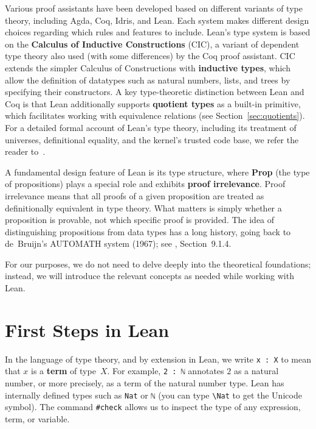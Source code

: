 Various proof assistants have been developed based on different
variants of type theory, including Agda, Coq, Idris, and Lean.
Each system makes different design choices regarding which rules and
features to include.
Lean's type system is based on the \textbf{Calculus of Inductive
  Constructions} (CIC), a variant of dependent type theory also used
(with some differences) by the Coq proof assistant.
CIC extends the simpler Calculus of Constructions with
\textbf{inductive types}, which allow the definition of datatypes
such as natural numbers, lists, and trees by specifying their
constructors.
A key type-theoretic distinction between Lean and Coq is that Lean
additionally supports \textbf{quotient types} as a built-in
primitive, which facilitates working with equivalence relations
(see Section~\ref{sec:quotients}).
For a detailed formal account of Lean's type theory, including its
treatment of universes, definitional equality, and the kernel's
trusted code base, we refer the reader
to~\cite{carneiro2019type}.

A fundamental design feature of Lean is its type structure, where
\textbf{Prop} (the type of propositions) plays a special role and
exhibits \textbf{proof irrelevance}.
Proof irrelevance means that all proofs of a given proposition are
treated as definitionally equivalent in type theory.
What matters is simply whether a proposition is provable, not which
specific proof is provided.
The idea of distinguishing propositions from data types has a long
history, going back to de~Bruijn's AUTOMATH system (1967); see
\cite{thompson1999types}, Section~9.1.4.

For our purposes, we do not need to delve deeply into the theoretical
foundations; instead, we will introduce the relevant concepts as
needed while working with Lean.

\section{First Steps in Lean}\label{sec:first_steps}

In the language of type theory, and by extension in Lean, we write
\lstinline[language=lean]|x : X| to mean that $x$ is a \textbf{term}
of type~$X$.
For example, \lstinline[language=lean]|2 : ℕ| annotates $2$ as a
natural number, or more precisely, as a term of the natural number
type.
Lean has internally defined types such as
\lstinline[language=lean]|Nat| or \lstinline[language=lean]|ℕ|
(you can type \texttt{\textbackslash Nat} to get the Unicode symbol).
The command \lstinline[language=lean]|#check| allows us to inspect the
type of any expression, term, or variable.

